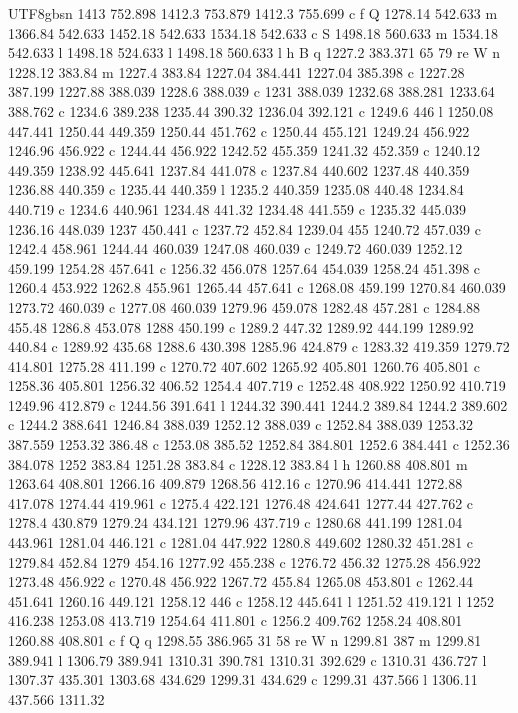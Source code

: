 \documentclass[11pt,a4paper,oneside]{report}
\begin{document}
\begin{CJK*}{UTF8}{gbsn}
{1413 752.898 1412.3 753.879 1412.3 755.699 c f Q 1278.14 542.633 m 1366.84 542.633 1452.18 542.633
1534.18 542.633 c S 1498.18 560.633 m 1534.18 542.633 l 1498.18 524.633 l 1498.18 560.633 l h B q 1227.2
383.371 65 79 re W n 1228.12 383.84 m 1227.4 383.84 1227.04 384.441 1227.04 385.398 c 1227.28 387.199
1227.88 388.039 1228.6 388.039 c 1231 388.039 1232.68 388.281 1233.64 388.762 c 1234.6 389.238 1235.44
390.32 1236.04 392.121 c 1249.6 446 l 1250.08 447.441 1250.44 449.359 1250.44 451.762 c 1250.44 455.121
1249.24 456.922 1246.96 456.922 c 1244.44 456.922 1242.52 455.359 1241.32 452.359 c 1240.12 449.359
1238.92 445.641 1237.84 441.078 c 1237.84 440.602 1237.48 440.359 1236.88 440.359 c 1235.44 440.359 l
1235.2 440.359 1235.08 440.48 1234.84 440.719 c 1234.6 440.961 1234.48 441.32 1234.48 441.559 c 1235.32
445.039 1236.16 448.039 1237 450.441 c 1237.72 452.84 1239.04 455 1240.72 457.039 c 1242.4 458.961
1244.44 460.039 1247.08 460.039 c 1249.72 460.039 1252.12 459.199 1254.28 457.641 c 1256.32 456.078
1257.64 454.039 1258.24 451.398 c 1260.4 453.922 1262.8 455.961 1265.44 457.641 c 1268.08 459.199 1270.84
460.039 1273.72 460.039 c 1277.08 460.039 1279.96 459.078 1282.48 457.281 c 1284.88 455.48 1286.8 453.078
1288 450.199 c 1289.2 447.32 1289.92 444.199 1289.92 440.84 c 1289.92 435.68 1288.6 430.398 1285.96
424.879 c 1283.32 419.359 1279.72 414.801 1275.28 411.199 c 1270.72 407.602 1265.92 405.801 1260.76
405.801 c 1258.36 405.801 1256.32 406.52 1254.4 407.719 c 1252.48 408.922 1250.92 410.719 1249.96 412.879
c 1244.56 391.641 l 1244.32 390.441 1244.2 389.84 1244.2 389.602 c 1244.2 388.641 1246.84 388.039 1252.12
388.039 c 1252.84 388.039 1253.32 387.559 1253.32 386.48 c 1253.08 385.52 1252.84 384.801 1252.6 384.441
c 1252.36 384.078 1252 383.84 1251.28 383.84 c 1228.12 383.84 l h 1260.88 408.801 m 1263.64 408.801
1266.16 409.879 1268.56 412.16 c 1270.96 414.441 1272.88 417.078 1274.44 419.961 c 1275.4 422.121 1276.48
424.641 1277.44 427.762 c 1278.4 430.879 1279.24 434.121 1279.96 437.719 c 1280.68 441.199 1281.04
443.961 1281.04 446.121 c 1281.04 447.922 1280.8 449.602 1280.32 451.281 c 1279.84 452.84 1279 454.16
1277.92 455.238 c 1276.72 456.32 1275.28 456.922 1273.48 456.922 c 1270.48 456.922 1267.72 455.84 1265.08
453.801 c 1262.44 451.641 1260.16 449.121 1258.12 446 c 1258.12 445.641 l 1251.52 419.121 l 1252 416.238
1253.08 413.719 1254.64 411.801 c 1256.2 409.762 1258.24 408.801 1260.88 408.801 c f Q q 1298.55 386.965
31 58 re W n 1299.81 387 m 1299.81 389.941 l 1306.79 389.941 1310.31 390.781 1310.31 392.629 c 1310.31
436.727 l 1307.37 435.301 1303.68 434.629 1299.31 434.629 c 1299.31 437.566 l 1306.11 437.566 1311.32
}
\end{CJK*}
\end{document}
